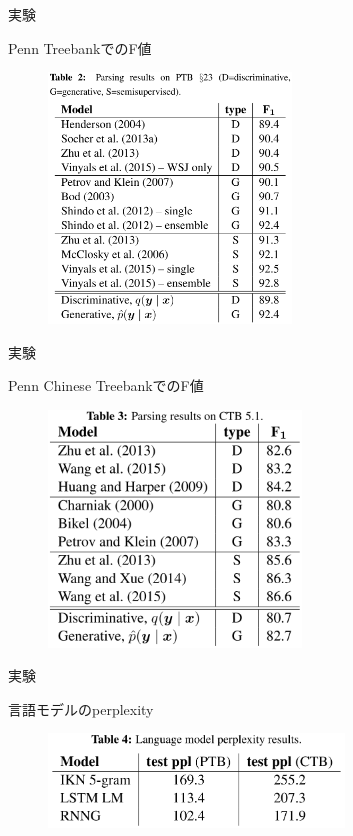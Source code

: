 \documentclass[aspectratio=43,unicode,10pt]{beamer}
\begin{document}
\begin{frame}{実験}
  \begin{block}{Penn TreebankでのF値}
    \begin{figure}
      \includegraphics[width=0.575\textwidth]{fig/tab_2.png}
    \end{figure}
  \end{block}
\end{frame}

\begin{frame}{実験}
  \begin{block}{Penn Chinese TreebankでのF値}
    \begin{figure}
      \includegraphics[width=0.6\textwidth]{fig/tab_3.png}
    \end{figure}
  \end{block}
\end{frame}

\begin{frame}{実験}
  \begin{block}{言語モデルのperplexity}
    \begin{figure}
      \includegraphics[width=0.7\textwidth]{fig/tab_4.png}
    \end{figure}
  \end{block}
\end{frame}
\end{document}
